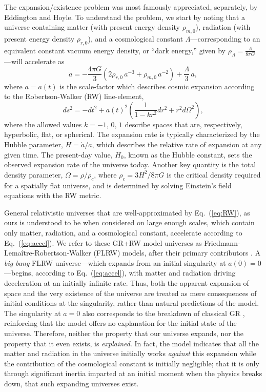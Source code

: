 \documentclass[aps,prd,reprint,superscriptaddress]{revtex4-2}
\begin{document}
The expansion/existence problem was most famously appreciated, separately, by Eddington \cite{Eddington1933} and Hoyle. 
To understand the problem, we start by noting that a universe containing matter (with present energy density $\rho_{m,0}$), radiation (with present energy density $\rho_{r,0}$), and a cosmological constant $\Lambda$---corresponding to an equivalent constant vacuum energy density, or ``dark energy,'' given by $\rho_{\Lambda} = \frac{\Lambda}{8\pi G}$---will accelerate as
\begin{equation}
    \ddot{a}=-\frac{4\pi G}{3}\left(2\rho_{r,0}\,a^{-3} + \rho_{m,0}\,a^{-2}\right) + \frac{\Lambda}{3}\,a,\label{eq:accel}
\end{equation}
where $a=a(t)$ is the scale-factor which describes cosmic expansion according to the Robertson-Walker (RW) line-element,
\begin{equation}
    ds^2=-dt^2+a(t)^2\left(\frac{1}{1-kr^2}dr^2+r^2d\Omega^2\right),\label{eq:RW}
\end{equation}
where the allowed values $k=-1,\,0,\,1$ describe spaces that are, respectively, hyperbolic, flat, or spherical. The expansion rate is typically characterized by the Hubble parameter, $H = \dot{a}/a$, which describes the relative rate of expansion at any given time. The present-day value, $H_0$, known as the Hubble constant, sets the observed expansion rate of the universe today. Another key quantity is the total density parameter, $\Omega = \rho / \rho_c$, where $\rho_c = 3H^2 / 8\pi G$ is the critical density required for a spatially flat universe, and is determined by solving Einstein's field equations with the RW metric. 

General relativistic universes that are well-approximated by Eq.~(\ref{eq:RW}), as ours is understood to be when considered on large enough scales, which contain only matter, radiation, and a cosmological constant, accelerate according to Eq.~(\ref{eq:accel}). We refer to these GR+RW model universes as Friedmann-Lema\^{i}tre-Robertson-Walker (FLRW) models, after their primary contributors \cite{Friedmann1922,Friedmann1924,Lemaitre1927,Robertson1935,Walker1937}. A \textit{big bang} FLRW universe---which expands from an initial singularity at $a(0)=0$---begins, according to Eq.~(\ref{eq:accel}), with matter and radiation driving deceleration at an initially infinite rate. Thus, both the apparent expansion of space \cite{Hubble1929} and the very existence of the universe are treated as mere consequences of initial conditions at the singularity, rather than natural predictions of the model. The singularity at $a=0$ also corresponds to the breakdown of classical GR \cite{Hawking1970}, reinforcing that the model offers no explanation for the initial state of the universe. Therefore, neither the property that our universe expands, nor the property that it even exists, is \textit{explained}. In fact, the model indicates that all the matter and radiation in the universe initially works \textit{against} this expansion while the contribution of the cosmological constant is initially negligible; that it is only through significant inertia imparted at an initial moment when the physics breaks down, that such expanding universes exist.
\end{document}
